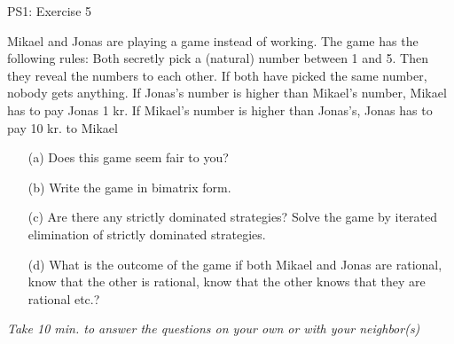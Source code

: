 \begin{frame}{PS1: Exercise 5}
\begin{multicols}{2}
  Mikael and Jonas are playing a game instead of working. The game has the following
  rules: Both secretly pick a (natural) number between 1 and 5. Then they reveal the
  numbers to each other. If both have picked the same number, nobody gets anything. If
  Jonas’s number is higher than Mikael’s number, Mikael has to pay Jonas 1 kr. If Mikael’s
  number is higher than Jonas’s, Jonas has to pay 10 kr. to Mikael
\vfill\null
\columnbreak
\begin{enumerate}
  \item[(a)] Does this game seem fair to you?
  \item[(b)] Write the game in bimatrix form.
  \item[(c)] Are there any strictly dominated strategies? Solve the game by iterated elimination of strictly dominated strategies.
  \item[(d)] What is the outcome of the game if both Mikael and Jonas are rational, know that the other is rational, know that the other knows that they are rational etc.?
\end{enumerate}
\vfill\null
\end{multicols}
\textit{Take 10 min. to answer the questions on your own or with your neighbor(s)}
\end{frame}

